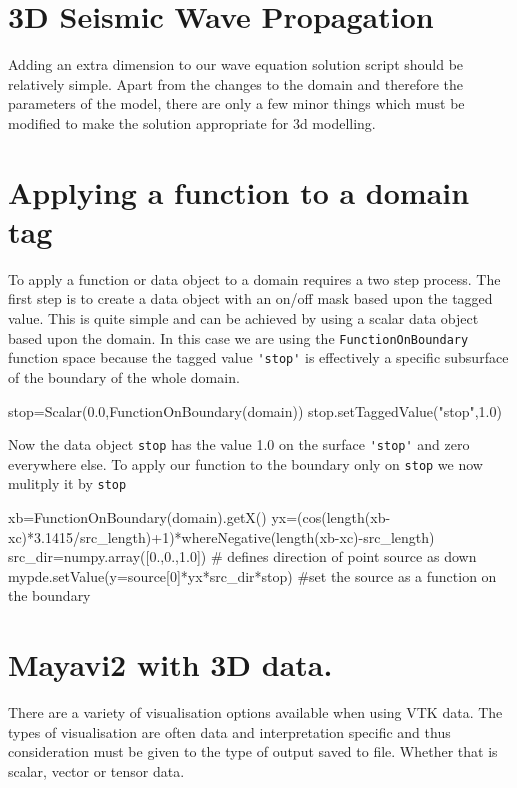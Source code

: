 \section{3D Seismic Wave Propagation}
Adding an extra dimension to our wave equation solution script should be
relatively simple. Apart from the changes to the domain and therefore the
parameters of the model, there are only a few minor things which must be
modified to make the solution appropriate for 3d modelling.

\section{Applying a function to a domain tag}
To apply a function or data object to a domain requires a two step process. The
first step is to create a data object with an on/off mask based upon the tagged
value. This is quite simple and can be achieved by using a scalar data object
based upon the domain. In this case we are using the \verb!FunctionOnBoundary!
function space because the tagged value \verb!'stop'! is effectively a specific
subsurface of the boundary of the whole domain. 
\begin{python}
stop=Scalar(0.0,FunctionOnBoundary(domain))
stop.setTaggedValue("stop",1.0)
\end{python}
Now the data object \verb|stop| has the value 1.0 on the surface
\verb!'stop'! and zero everywhere else.
% 
 To apply our function to the boundary only on \verb|stop| we now
 mulitply it by \verb|stop|
\begin{python}
xb=FunctionOnBoundary(domain).getX()
yx=(cos(length(xb-xc)*3.1415/src_length)+1)*whereNegative(length(xb-xc)-src_length)
src_dir=numpy.array([0.,0.,1.0]) # defines direction of point source as down
mypde.setValue(y=source[0]*yx*src_dir*stop) #set the source as a function on the boundary
\end{python}

\section{Mayavi2 with 3D data.}
There are a variety of visualisation options available when using VTK data. The
types of visualisation are often data and interpretation specific and thus
consideration must be given to the type of output saved to file. Whether that is
scalar, vector or tensor data.

